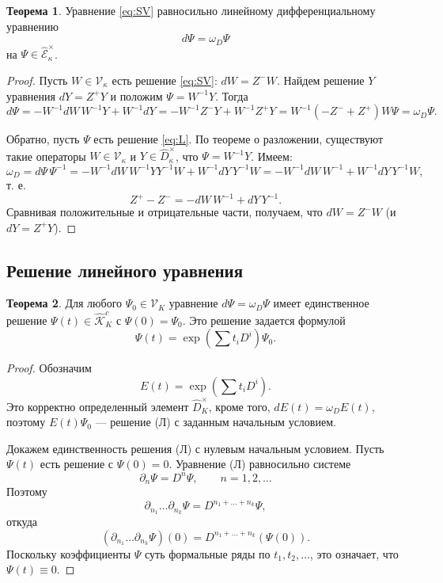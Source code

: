 \documentclass{article}
\theoremstyle{definition}
\newtheorem{theorem}{Теорема}[section]
\theoremstyle{definition} %
\theoremstyle{remark}     %
\theoremstyle{definition}
\theoremstyle{definition}
\theoremstyle{definition}
\theoremstyle{definition}
\theoremstyle{definition}
\theoremstyle{definition}
\theoremstyle{definition}
\theoremstyle{definition}
\begin{document}
\begin{theorem}
  Уравнение \ref{eq:SV} равносильно линейному дифференциальному уравнению
  \begin{equation*}\label{eq:L}
    d\Psi = \omega_{D}\Psi \tag{Л}
  \end{equation*}
  на \( \Psi \in \hat{\mathcal{E}}_{\kappa}^{\times} \).
\end{theorem}

\begin{proof}
  Пусть \( W \in \mathcal{V}_{\kappa} \) есть решение \ref{eq:SV}: \( dW = Z^{-}W \). Найдем решение \( Y \) уравнения \( dY = Z^{+}Y \) и положим \( \Psi = W^{-1}Y \). Тогда
  \[
    d\Psi = -W^{-1}dW\,W^{-1}Y + W^{-1}dY = -W^{-1}Z^{-}Y + W^{-1}Z^{+}Y = W^{-1}(-Z^{-}+Z^{+})W\Psi = \omega_{D}\Psi.
  \]

  Обратно, пусть \( \Psi \) есть решение \ref{eq:L}. По теореме о разложении, существуют такие операторы \( W \in \mathcal{V}_{\kappa} \) и \( Y \in \hat{D}_{\kappa}^{\times} \), что \( \Psi = W^{-1}Y \). Имеем:
  \[
    \omega_{D} = d\Psi\,\Psi^{-1} = -W^{-1}dW\,W^{-1}Y Y^{-1}W + W^{-1}dY\,Y^{-1}W = -W^{-1}dW\,W^{-1} + W^{-1}dY\,Y^{-1}W,
  \]
  т. е.
  \[
    Z^{+} - Z^{-} = -dW\,W^{-1} + dY\,Y^{-1}.
  \]
  Сравнивая положительные и отрицательные части, получаем, что \( dW = Z^{-}W \) (и \( dY = Z^{+}Y \)).
\end{proof}






\subsection{Решение линейного уравнения}


\begin{theorem}
  Для любого \(\Psi_0 \in \mathcal{V}_K\) уравнение \(d\Psi = \omega_D \Psi\) имеет единственное решение \(\Psi(t) \in \hat{\mathcal{K}}^c_K\) с \(\Psi(0) = \Psi_0\). Это решение задается формулой
  \[
    \Psi(t) = \exp\left(\sum t_i D^i\right) \Psi_0.
  \]
\end{theorem}

\begin{proof}
  Обозначим
  \[
    E(t) = \exp\left(\sum t_i D^i\right).
  \]
  Это корректно определенный элемент \(\hat{D}^\times_K\), кроме того, \(dE(t) = \omega_D E(t)\), поэтому \(E(t)\Psi_0\) — решение (Л) с заданным начальным условием.

  Докажем единственность решения (Л) с нулевым начальным условием. Пусть \(\Psi(t)\) есть решение с \(\Psi(0) = 0\). Уравнение (Л) равносильно системе
  \[
    \partial_n \Psi = D^n \Psi, \qquad n = 1, 2, \dots
  \]
  Поэтому
  \[
    \partial_{n_1} \dots \partial_{n_k} \Psi = D^{n_1 + \dots + n_k} \Psi,
  \]
  откуда
  \[
    (\partial_{n_1} \dots \partial_{n_k} \Psi)(0) = D^{n_1 + \dots + n_k} (\Psi(0)).
  \]
  Поскольку коэффициенты \(\Psi\) суть формальные ряды по \(t_1, t_2, \dots\), это означает, что \(\Psi(t) \equiv 0\).
\end{proof}
\end{document}
